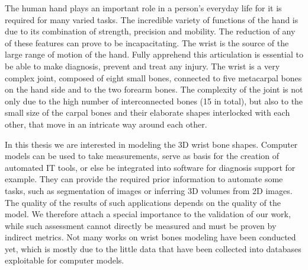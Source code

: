 \documentclass[../../Main_ManuscritThese.tex]{subfiles}
\begin{document}
\TitleBtwLines

\setcounter{chapter}{0}
\renewcommand{\thechapter}{\Roman{chapter}}%

\label{chap:Introduction}
\pagestyle{introStyle}



The human hand plays an important role in a person's everyday life for it is required for many varied tasks. The incredible variety of functions of the hand is due to its combination of strength, precision and mobility. The reduction of any of these features can prove to be incapacitating. The wrist is the source of the large range of motion of the hand. Fully apprehend this articulation is essential to be able to make diagnosis, prevent and treat any injury. The wrist is a very complex joint, composed of eight small bones, connected to five metacarpal bones on the hand side and to the two forearm bones. The complexity of the joint is not only due to the  high number of interconnected bones (15 in total), but also to the small size of the carpal bones and their elaborate shapes interlocked with each other, that move in an intricate way around each other.

In this thesis we are interested in modeling the 3D wrist bone shapes. Computer models can be used to take measurements, serve as basis for the creation of automated IT tools, or else be integrated into software for diagnosis support for example. They can provide the required prior information to automate some tasks, such as segmentation of images or inferring 3D volumes from 2D images. The quality of the results of such applications depends on the quality of the model. We therefore attach a special importance to the validation of our work, while such assessment cannot directly be measured and must be proven by indirect metrics. Not many works on wrist bones modeling have been conducted yet, which is mostly due to the little data that have been collected into databases exploitable for computer models. 
\end{document}
